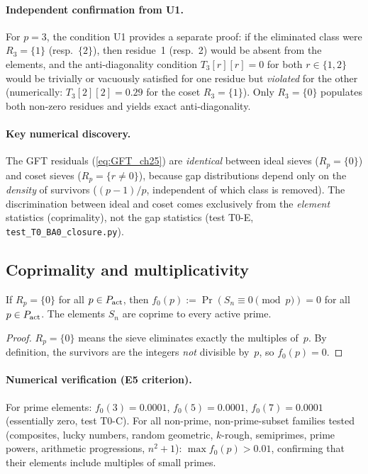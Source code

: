 \documentclass[12pt,a4paper]{article}
\begin{document}
\paragraph{Independent confirmation from U1.}
For $p = 3$, the condition U1 provides a separate proof: if the
eliminated class were $R_3 = \{1\}$ (resp.\ $\{2\}$), then residue~1
(resp.~2) would be absent from the elements, and the anti-diagonality
condition $T_3[r][r] = 0$ for both $r \in \{1, 2\}$ would be
trivially or vacuously satisfied for one residue but \emph{violated}
for the other (numerically: $T_3[2][2] = 0.29$ for the coset
$R_3 = \{1\}$). Only $R_3 = \{0\}$ populates both non-zero residues
and yields exact anti-diagonality.

\paragraph{Key numerical discovery.}
The GFT residuals (\cref{eq:GFT_ch25}) are \emph{identical} between
ideal sieves ($R_p = \{0\}$) and coset sieves ($R_p = \{r \neq 0\}$),
because gap distributions depend only on the \emph{density} of survivors
($(p-1)/p$, independent of which class is removed). The discrimination
between ideal and coset comes exclusively from the \emph{element}
statistics (coprimality), not the gap statistics
(test T0-E, \texttt{test\_T0\_BA0\_closure.py}).

\subsection{Coprimality and multiplicativity}
\label{sec:ch25_coprimality}

\begin{lemma}[Coprimality]
\label{lem:coprimality}
If $R_p = \{0\}$ for all $p \in P_{\rm act}$, then $f_0(p) :=
\Pr(S_n \equiv 0 \pmod{p}) = 0$ for all $p \in P_{\rm act}$.
The elements $S_n$ are coprime to every active prime.
\end{lemma}

\begin{proof}
$R_p = \{0\}$ means the sieve eliminates exactly the multiples of~$p$.
By definition, the survivors are the integers \emph{not} divisible
by~$p$, so $f_0(p) = 0$.
\end{proof}

\paragraph{Numerical verification (E5 criterion).}
For prime elements: $f_0(3) = 0.0001$, $f_0(5) = 0.0001$,
$f_0(7) = 0.0001$ (essentially zero, test T0-C).
For all non-prime, non-prime-subset families tested (composites,
lucky numbers, random geometric, $k$-rough, semiprimes, prime powers,
arithmetic progressions, $n^2+1$): $\max f_0(p) > 0.01$, confirming
that their elements include multiples of small primes.
\end{document}
